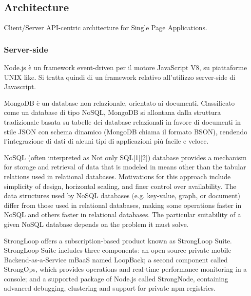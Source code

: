 \documentclass{sig-alternate}
\begin{document}
\subsection{Architecture}

Client/Server API-centric architecture for Single Page Applications.

\subsubsection{Server-side}

\begin{description}
\itemsep1pt\parskip0pt
	\item[Node.js web framework] 
		Node.js è un framework event-driven per il motore JavaScript V8, su piattaforme UNIX like. Si tratta quindi di un framework relativo all'utilizzo server-side di Javascript.
	\item[MongDB]
		MongoDB è un database non relazionale, orientato ai documenti. Classificato come un database di tipo NoSQL, MongoDB si allontana dalla struttura tradizionale basata su tabelle dei database relazionali in favore di documenti in stile JSON con schema dinamico (MongoDB chiama il formato BSON), rendendo l'integrazione di dati di alcuni tipi di applicazioni più facile e veloce.
\item[NoSQL]
		NoSQL (often interpreted as Not only SQL[1][2]) database provides a mechanism for storage and retrieval of data that is modeled in means other than the tabular relations used in relational databases. Motivations for this approach include simplicity of design, horizontal scaling, and finer control over availability. The data structures used by NoSQL databases (e.g. key-value, graph, or document) differ from those used in relational databases, making some operations faster in NoSQL and others faster in relational databases. The particular suitability of a given NoSQL database depends on the problem it must solve. 
	\item[Strongloop]
		StrongLoop offers a subscription-based product known as StrongLoop Suite. StrongLoop Suite includes three components: an open source private mobile Backend-as-a-Service mBaaS named LoopBack; a second component called StrongOps, which provides operations and real-time performance monitoring in a console; and a supported package of Node.js called StrongNode, containing advanced debugging, clustering and support for private npm registries.
\end{description}
\end{document}
